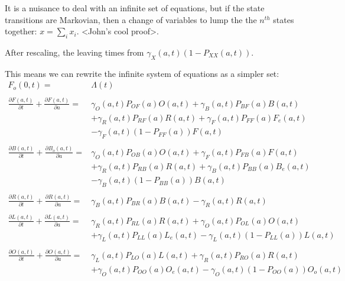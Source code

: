 \documentclass{article}
\begin{document}
It is a nuisance to deal with an infinite set of equations, but
if the state transitions are Markovian, then a change of
variables to lump the the $n^{th}$ states together: $x = \sum_i
x_i$. <John's cool proof>.  

After rescaling, the leaving times from $\gamma_X(a,t)
\left(1-P_{XX}\left(a,t\right)\right).$ 

This means we can rewrite the infinite system of equations as a simpler set:
%
\begin{equation}\begin{array}{rl}
F_o(0,t) =& \Lambda(t) \\ 
%
&\\
\frac{\partial F(a,t)}{\partial t} + \frac{\partial F(a,t)}{\partial a} =& 
\gamma_O(a,t) P_{OF}(a) O(a,t) 
+ \gamma_B(a,t) P_{BF}(a) B(a,t) \\&
 + \gamma_R(a,t) P_{RF}(a) R(a,t)
+ \gamma_F(a,t) P_{FF}(a) F_e(a,t) \\ &
- \gamma_F(a,t) \left( 1-P_{FF}(a) \right) F(a,t) \\ 
%
%
&\\
\frac{\partial B(a,t)}{\partial t} + \frac{\partial B_o(a,t)}{\partial a} =&  \gamma_O(a,t) P_{OB}(a) O(a,t) + \gamma_F(a,t) P_{FB}(a) F(a,t) \\ & 
+ \gamma_R(a,t) P_{RB}(a) R(a,t) 
+ \gamma_B(a,t) P_{BB}(a) B_e(a,t)\\ & 
- \gamma_B(a,t) \left( 1-P_{BB}(a) \right) B(a,t) \\ 
%
&\\
\frac{\partial R(a,t)}{\partial t} + \frac{\partial R(a,t)}{\partial a} =&  \gamma_B(a,t) P_{BR}(a) B(a,t) - \gamma_R(a,t) R(a,t)\\ 
%
&\\
\frac{\partial L(a,t)}{\partial t} + \frac{\partial L(a,t)}{\partial a} =& \gamma_R(a,t) P_{RL}(a) R(a,t) + 
\gamma_O(a,t) P_{OL}(a) O(a,t) \\&
+ \gamma_L(a,t)  P_{LL}(a) L_e(a,t)
- \gamma_L(a,t) \left( 1-P_{LL}(a) \right)  L(a,t)
\\ 
%
&\\
\frac{\partial O(a,t)}{\partial t} + \frac{\partial O(a,t)}{\partial a} =& \gamma_L(a,t) P_{LO}(a) L(a,t) 
+ \gamma_R(a,t) P_{RO}(a) R(a,t)  
\\&
+ \gamma_O(a,t) P_{OO}(a) O_e(a,t)
- \gamma_O(a,t) \left( 1-P_{OO}(a) \right) O_o(a,t)

%
\end{array}\end{equation}
\end{document}
